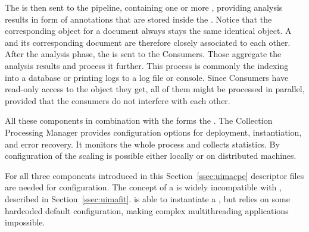 The \cas{} is then sent to the pipeline, containing one or more \anens{}, providing analysis results in form of annotations that are stored inside the \cas{}. Notice that the corresponding \cas{} object for a document always stays the same identical object. A \cas{} and its corresponding document are therefore closely associated to each other. After the analysis phase, the \cas{} is sent to the \cas{} Consumers. Those aggregate the analysis results and process it further. This process is commonly the indexing into a database or printing logs to a log file or console. Since \cas{} Consumers have read-only access to the \cas{} object they get, all of them might be processed in parallel, provided that the consumers do not interfere with each other.

All these components in combination with the \uima{} \cpm{} forms the \uimacpe{}. The Collection Processing Manager provides configuration options for deployment, instantiation, and error recovery. It monitors the whole process and collects statistics. By configuration of the \cpm{} scaling is possible either locally or on distributed machines.

For all three components introduced in this Section~\ref{ssec:uimacpe} \xml{} descriptor files are needed for configuration. The concept of a \uimacpe{} is widely incompatible with \uimafit{}, described in Section~\ref{ssec:uimafit}. \uimafit{} is able to instantiate a \cpe{}, but relies on some hardcoded default configuration, making complex multithreading applications impossible.


